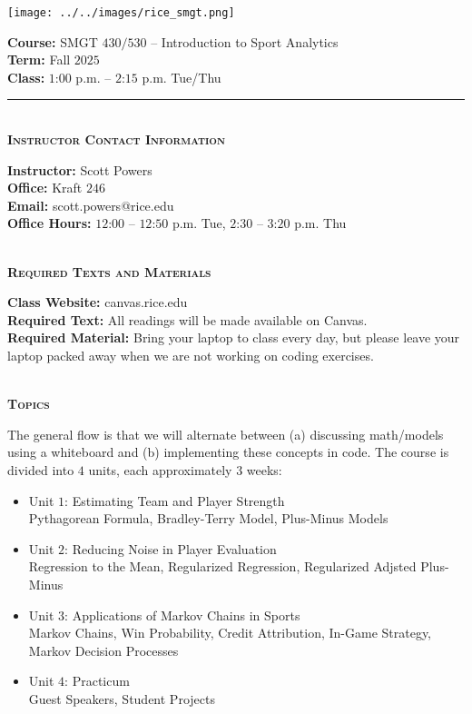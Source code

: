 \documentclass[11pt]{article}
\begin{document}
\begin{minipage}[c]{0.4\linewidth}
  \texttt{[image: ../../images/rice\_smgt.png]}
\end{minipage}
\begin{minipage}[c]{0.6\linewidth}
  \raggedleft
  {\bf Course:} SMGT $430/530$ -- Introduction to Sport Analytics\\
  {\bf Term:} Fall $2025$\\
  {\bf Class:} $1$:$00$ p.m. -- $2$:$15$ p.m. Tue/Thu
\end{minipage}

\hrule

~\\
\textbf{\textsc{Instructor Contact Information}}
\begin{adjustwidth}{1cm}{0cm}
	{\bf Instructor:} Scott Powers\\
  {\bf Office:} Kraft $246$\\
  {\bf Email:} scott.powers@rice.edu\\
  {\bf Office Hours:} $12$:$00$ -- $12$:$50$ p.m. Tue, $2$:$30$ -- $3$:$20$ p.m. Thu
\end{adjustwidth}

~\\
\textbf{\textsc{Required Texts and Materials}}
\begin{adjustwidth}{1cm}{0cm}
	{\bf Class Website:} canvas.rice.edu\\
	{\bf Required Text:} All readings will be made available on Canvas.\\
	{\bf Required Material:} Bring your laptop to class every day, but please leave your laptop packed away when we are not working on coding exercises.
\end{adjustwidth}

~\\
\textbf{\textsc{Topics}}
\begin{adjustwidth}{1cm}{0cm}
  The general flow is that we will alternate between (a) discussing math/models using a whiteboard and (b) implementing these concepts in code. The course is divided into $4$ units, each approximately $3$ weeks:
  \begin{itemize}
    \item Unit $1$: Estimating Team and Player Strength\\
    Pythagorean Formula, Bradley-Terry Model, Plus-Minus Models
    \item Unit $2$: Reducing Noise in Player Evaluation\\
    Regression to the Mean, Regularized Regression, Regularized Adjsted Plus-Minus
    \item Unit $3$: Applications of Markov Chains in Sports\\
    Markov Chains, Win Probability, Credit Attribution, In-Game Strategy, Markov Decision Processes
    \item Unit $4$: Practicum\\
    Guest Speakers, Student Projects
  \end{itemize}
\end{adjustwidth}
\end{document}
